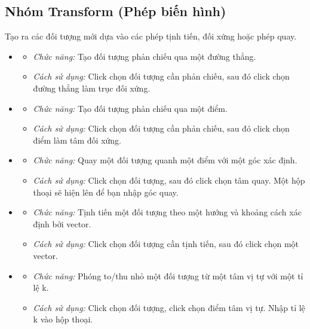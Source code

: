 \documentclass[12pt,a4paper]{article}
\begin{document}
\subsection{Nhóm Transform (Phép biến hình)}
Tạo ra các đối tượng mới dựa vào các phép tịnh tiến, đối xứng hoặc phép quay.
\begin{itemize}[label=\textcolor{primary}{\faSync}]
    \item {}
    \begin{itemize}
        \item \textit{Chức năng:} Tạo đối tượng phản chiếu qua một đường thẳng.
        \item \textit{Cách sử dụng:} Click chọn đối tượng cần phản chiếu, sau đó click chọn đường thẳng làm trục đối xứng.
    \end{itemize}

    \item {}
    \begin{itemize}
        \item \textit{Chức năng:} Tạo đối tượng phản chiếu qua một điểm.
        \item \textit{Cách sử dụng:} Click chọn đối tượng cần phản chiếu, sau đó click chọn điểm làm tâm đối xứng.
    \end{itemize}
    
    \item {}
    \begin{itemize}
        \item \textit{Chức năng:} Quay một đối tượng quanh một điểm với một góc xác định.
        \item \textit{Cách sử dụng:} Click chọn đối tượng, sau đó click chọn tâm quay. Một hộp thoại sẽ hiện lên để bạn nhập góc quay.
    \end{itemize}

    \item {}
    \begin{itemize}
        \item \textit{Chức năng:} Tịnh tiến một đối tượng theo một hướng và khoảng cách xác định bởi vector.
        \item \textit{Cách sử dụng:} Click chọn đối tượng cần tịnh tiến, sau đó click chọn một vector.
    \end{itemize}
    
    \item {}
    \begin{itemize}
        \item \textit{Chức năng:} Phóng to/thu nhỏ một đối tượng từ một tâm vị tự với một tỉ lệ k.
        \item \textit{Cách sử dụng:} Click chọn đối tượng, click chọn điểm tâm vị tự. Nhập tỉ lệ k vào hộp thoại.
    \end{itemize}
\end{itemize}
\end{document}
